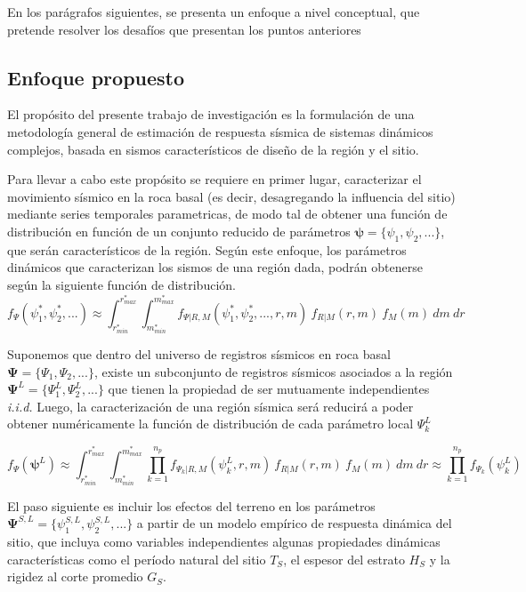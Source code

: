 \documentclass[
]{krantz}
\begin{document}
En los parágrafos siguientes, se presenta un enfoque a nivel conceptual, que pretende resolver los desafíos que presentan los puntos anteriores

\hypertarget{enfoque-propuesto}{%
\subsection*{Enfoque propuesto}\label{enfoque-propuesto}}

El propósito del presente trabajo de investigación es la formulación de una metodología general de estimación de respuesta sísmica de sistemas dinámicos complejos, basada en sismos característicos de diseño de la región y el sitio.

Para llevar a cabo este propósito se requiere en primer lugar, caracterizar el movimiento sísmico en la roca basal (es decir, desagregando la influencia del sitio) mediante series temporales parametricas, de modo tal de obtener una función de distribución en función de un conjunto reducido de parámetros \(\pmb \psi = \{ \psi_1,\psi_2,... \}\), que serán característicos de la región. Según este enfoque, los parámetros dinámicos que caracterizan los sismos de una región dada, podrán obtenerse según la siguiente función de distribución. \[ \begin{equation}  
f_{\Psi}(\psi_1^*,\psi_2^*,...) \approx \int^{r_{max}^*}_{r_{min}^*}  \int^{m_{max}^*}_{m_{min}^*} f_{\Psi|R,M}(\psi_1^*,\psi_2^*,...,r,m) \  f_{R|M}(r,m)\  f_M(m) \ dm \ dr 
\end{equation}\]

Suponemos que dentro del universo de registros sísmicos en roca basal \(\pmb\Psi = \{ \Psi_1,\Psi_2,... \}\), existe un subconjunto de registros sísmicos asociados a la región \(\pmb\Psi^L = \{ \Psi_1^L,\Psi_2^L,... \}\) que tienen la propiedad de ser mutuamente independientes \emph{i.i.d.} Luego, la caracterización de una región sísmica será reducirá a poder obtener numéricamente la función de distribución de cada parámetro local \(\Psi_k^{L}\)

\[ \begin{equation}  
f_{\Psi}\left(\pmb \psi^L\right) \approx \int^{r_{max}^*}_{r_{min}^*}  \int^{m_{max}^*}_{m_{min}^*} \prod^{n_p}_{k=1}{f_{\Psi_k|R,M}(\psi_k^L,r,m)} \  f_{R|M}(r,m)\  f_M(m) \ dm \ dr \approx  \prod^{n_p}_{k=1}{f_{\Psi_k}(\psi_k^L)}
\end{equation}\]

El paso siguiente es incluir los efectos del terreno en los parámetros \(\pmb\Psi^{S,L}=\{\psi_1^{S,L},\psi_2^{S,L},... \}\) a partir de un modelo empírico de respuesta dinámica del sitio, que incluya como variables independientes algunas propiedades dinámicas características como el período natural del sitio \(T_S\), el espesor del estrato \(H_S\) y la rigidez al corte promedio \(G_S\).
\end{document}
